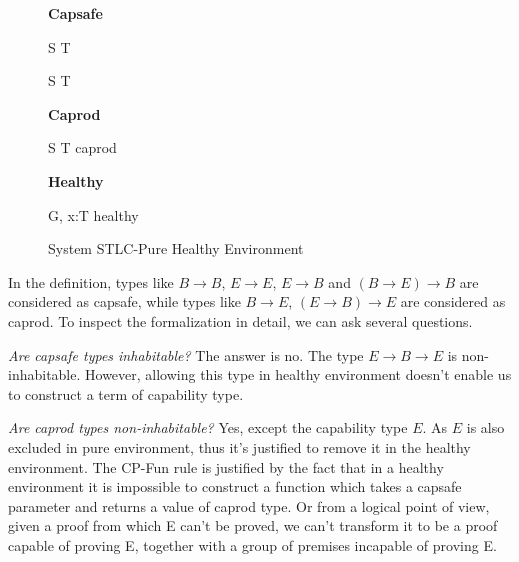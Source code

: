 \begin{figure}[h]
\begin{framed}

\setlength{\columnseprule}{0.4pt}
\begin{multicols}{2}

\textbf{Capsafe}


{ S \to T \quad {} }

{ S \to T \quad {} }

\columnbreak

\textbf{Caprod}


{ S \to T \quad caprod }

\textbf{Healthy}


{ G, \; x:T \quad healthy }


\end{multicols}
\end{framed}

\caption{System STLC-Pure Healthy Environment}
\label{fig:stlc-pure-healthy-definition}
\end{figure}

In the definition, types like $B \to B$, $E \to E$, $E \to B$ and
$(B \to E) \to B$ are considered as capsafe, while types like
$B \to E$, $(E \to B) \to E$ are considered as caprod. To inspect the
formalization in detail, we can ask several questions.

\emph{Are capsafe types inhabitable?} The answer is no. The type
$E \to B \to E$ is non-inhabitable. However, allowing this type in
healthy environment doesn't enable us to construct a term of
capability type.

\emph{Are caprod types non-inhabitable?} Yes, except the capability
type $E$. As $E$ is also excluded in pure environment, thus it's
justified to remove it in the healthy environment. The CP-Fun rule is
justified by the fact that in a healthy environment it is impossible
to construct a function which takes a capsafe parameter and returns a
value of caprod type. Or from a logical point of view, given a proof
from which E can't be proved, we can't transform it to be a proof
capable of proving E, together with a group of premises incapable of
proving E.

